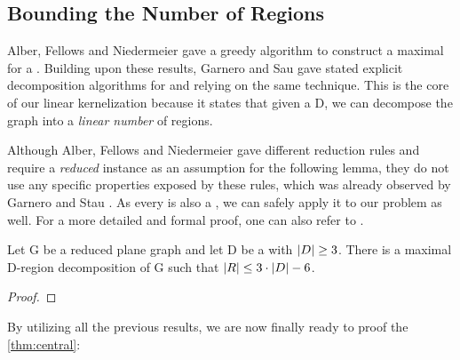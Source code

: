 \subsection{Bounding the Number of Regions}

Alber, Fellows and Niedermeier \cite[Proposition 1]{Alber2004} gave a greedy algorithm to construct a maximal \dreg for a \dom. Building upon these results, Garnero and Sau gave stated explicit decomposition algorithms for \rbdom \cite{Garnero2017} and \tdom \cite{Garnero2018} relying on the same technique. This is the core of our linear kernelization because it states that given a \dom D, we can decompose the graph into a \textit{linear number} of regions.


Although Alber, Fellows and Niedermeier\cite{Alber2004} gave different reduction rules and require a \textit{reduced} instance as an assumption for the following lemma, they do not use any specific properties exposed by these rules, which was already observed by Garnero and Stau \cite[Revision xx]{Garnero2018}.
As every \sdom is also a \dom, we can safely apply it to our problem as well. 
For a more detailed and formal proof, one can also refer to \cite[Proposition 1]{Garnero2018}.

\begin{lemma}\label{lemma:numRegions}
    Let G be a reduced plane graph and let D be a \sdom with $\abs{D}\geq 3$. There is a maximal D-region decomposition of G such that $\abs{R} \leq 3 \cdot \abs{D} - 6$.
\end{lemma}

\begin{lemma}\label{lemma:runtime}
\end{lemma}
\begin{proof} 
\end{proof}

\noindent By utilizing all the previous results, we are now finally ready to proof the \cref{thm:central}: 

\centraltheo*


